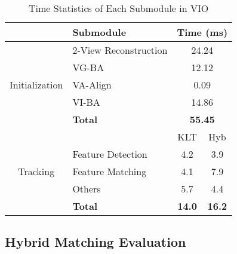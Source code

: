 \begin{table}[h]
    \caption{Time Statistics of Each Submodule in VIO}
    \centering
    \begin{tabular}{cp{}cc}
    \toprule
    & \textbf{Submodule} & \multicolumn{2}{c}{\textbf{Time (ms)}} \\
    \midrule
    \multirow{5}{*}{Initialization} & 2-View Reconstruction & \multicolumn{2}{c}{24.24} \\
    & VG-BA & \multicolumn{2}{c}{12.12} \\
    & VA-Align & \multicolumn{2}{c}{0.09} \\
    & VI-BA & \multicolumn{2}{c}{14.86} \\
    & \textbf{Total} & \multicolumn{2}{c}{\textbf{55.45}} \\
    \midrule
    \multirow{5}{*}{Tracking} &&KLT& Hyb\\ & Feature Detection&4.2& 3.9\\
    & Feature Matching&4.1& 7.9\\
    & Others& 5.7&4.4\\
    & \textbf{Total}&\textbf{14.0}& \textbf{16.2}\\
    \bottomrule
    \end{tabular}
    \label{tab:time_statistics}
\end{table}

 \subsection{Hybrid Matching Evaluation}



